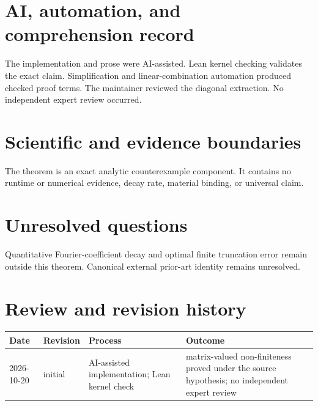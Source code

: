 \documentclass[11pt]{article}
\begin{document}
\section{AI, automation, and comprehension record}
The implementation and prose were AI-assisted. Lean kernel checking validates the exact
claim. Simplification and linear-combination automation produced checked proof terms. The
maintainer reviewed the diagonal extraction. No independent expert review occurred.

\section{Scientific and evidence boundaries}
The theorem is an exact analytic counterexample component. It contains no runtime or
numerical evidence, decay rate, material binding, or universal claim.

\section{Unresolved questions}
Quantitative Fourier-coefficient decay and optimal finite truncation error remain outside
this theorem. Canonical external prior-art identity remains unresolved.

\section{Review and revision history}
\begin{tabularx}{\textwidth}{@{}lllX@{}}\toprule
Date & Revision & Process & Outcome \\
\midrule
2026-10-20 & initial & AI-assisted implementation; Lean kernel check & matrix-valued non-finiteness proved under the source hypothesis; no independent expert review \\
\bottomrule\end{tabularx}
\end{document}
